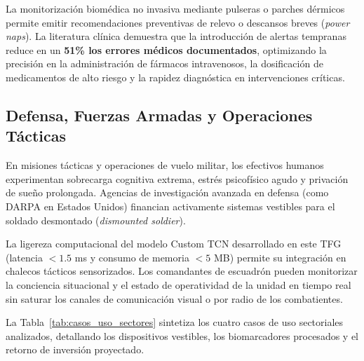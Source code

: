 La monitorización biomédica no invasiva mediante pulseras o parches dérmicos permite emitir recomendaciones preventivas de relevo o descansos breves (\textit{power naps}). La literatura clínica demuestra que la introducción de alertas tempranas reduce en un \textbf{51\% los errores médicos documentados}, optimizando la precisión en la administración de fármacos intravenosos, la dosificación de medicamentos de alto riesgo y la rapidez diagnóstica en intervenciones críticas.

\subsection{Defensa, Fuerzas Armadas y Operaciones Tácticas}

En misiones tácticas y operaciones de vuelo militar, los efectivos humanos experimentan sobrecarga cognitiva extrema, estrés psicofísico agudo y privación de sueño prolongada. Agencias de investigación avanzada en defensa (como DARPA en Estados Unidos) financian activamente sistemas vestibles para el soldado desmontado (\textit{dismounted soldier}).

La ligereza computacional del modelo Custom TCN desarrollado en este TFG (latencia $<1.5$ ms y consumo de memoria $<5$ MB) permite su integración en chalecos tácticos sensorizados. Los comandantes de escuadrón pueden monitorizar la conciencia situacional y el estado de operatividad de la unidad en tiempo real sin saturar los canales de comunicación visual o por radio de los combatientes.

La Tabla~\ref{tab:casos_uso_sectores} sintetiza los cuatro casos de uso sectoriales analizados, detallando los dispositivos vestibles, los biomarcadores procesados y el retorno de inversión proyectado.

